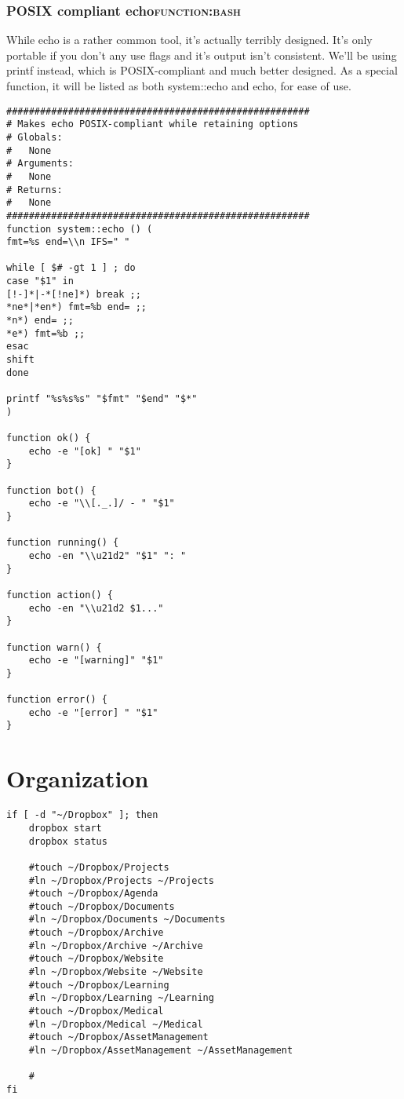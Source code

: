 \documentclass[11pt]{article}
\begin{document}
\subsubsection{POSIX compliant echo\hfill{}\textsc{function:bash}}
\label{sec:org0d0cf15}

While echo is a rather common tool, it's actually terribly designed. It's only portable if you don't any use flags and it's output isn't consistent. 
We'll be using printf instead, which is POSIX-compliant and much better designed. As a special function, it will be listed as both system::echo and echo, for ease of use.
\begin{verbatim}
######################################################
# Makes echo POSIX-compliant while retaining options
# Globals:
#   None
# Arguments:
#   None
# Returns:
#   None
######################################################
function system::echo () (
fmt=%s end=\\n IFS=" "

while [ $# -gt 1 ] ; do
case "$1" in
[!-]*|-*[!ne]*) break ;;
*ne*|*en*) fmt=%b end= ;;
*n*) end= ;;
*e*) fmt=%b ;;
esac
shift
done

printf "%s%s%s" "$fmt" "$end" "$*"
)

function ok() {
    echo -e "[ok] " "$1"
}

function bot() {
    echo -e "\\[._.]/ - " "$1"
}

function running() {
    echo -en "\\u21d2" "$1" ": "
}

function action() {
    echo -en "\\u21d2 $1..."
}

function warn() {
    echo -e "[warning]" "$1"
}

function error() {
    echo -e "[error] " "$1"
}
\end{verbatim}
\section{Organization}
\label{sec:org861554b}
\begin{verbatim}
if [ -d "~/Dropbox" ]; then
    dropbox start
    dropbox status

    #touch ~/Dropbox/Projects
    #ln ~/Dropbox/Projects ~/Projects
    #touch ~/Dropbox/Agenda
    #touch ~/Dropbox/Documents
    #ln ~/Dropbox/Documents ~/Documents
    #touch ~/Dropbox/Archive
    #ln ~/Dropbox/Archive ~/Archive
    #touch ~/Dropbox/Website
    #ln ~/Dropbox/Website ~/Website
    #touch ~/Dropbox/Learning
    #ln ~/Dropbox/Learning ~/Learning
    #touch ~/Dropbox/Medical
    #ln ~/Dropbox/Medical ~/Medical
    #touch ~/Dropbox/AssetManagement
    #ln ~/Dropbox/AssetManagement ~/AssetManagement

    #
fi
\end{verbatim}
\end{document}
